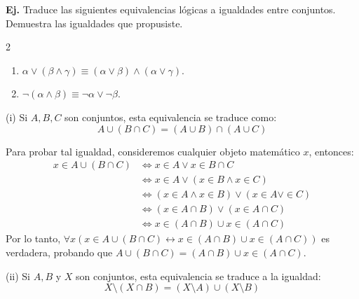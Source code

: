 \documentclass[letterpaper,DIV=14,headsepline,12pt]{scrartcl}
\makeatletter
\newcounter{Ejer}
\newcommand{\pts}{}
\newenvironment{ejercicio}[1]{\noindent
    \ifthenelse{\equal{#1}{1} \OR \equal{#1}{+1}}{\renewcommand{\pts}{\textbf{(#1 pt)}}}{\renewcommand{\pts}{\textbf{(#1 pts)}}}\textbf{Ej. \theEjer} \pts\stepcounter{Ejer}}{\vspace{.3cm}}
\newenvironment{solu}[1][]{%
        \par\pushQED{\hfill \lozenge}%
        \normalfont\topsep6pt \partopsep0pt %
        \trivlist
        \item[\hskip\labelsep
                \textbf{\textit{Solución.}}%
        ]#1
        }{%
        \popQED\endtrivlist\@endpefalse
    }
\makeatother
\begin{document}
    \begin{ejercicio}{1}
        Traduce las siguientes equivalencias lógicas a igualdades entre conjuntos. Demuestra las igualdades que propusiste.
        \begin{multicols}{2}
            \begin{enumerate}
                \item \(\alpha\lor(\beta\land\gamma)\equiv(\alpha\lor\beta)\land(\alpha\lor\gamma)\).
                \item \(\neg(\alpha\land\beta)\equiv\neg\alpha\lor\neg\beta\).
            \end{enumerate}
        \end{multicols}
    \end{ejercicio}
    \begin{solu}
        (i) Si $A,B,C$ son conjuntos, esta equivalencia se traduce como:
        \[ A \cup (B \cap C) = (A \cup B) \cap (A \cup C) \]
        
        Para probar tal igualdad, consideremos cualquier objeto matemático $x$, entonces:
        \begin{align*}
            x \in A \cup (B \cap C) & \Leftrightarrow x \in A \lor x \in B \cap C \tag*{Definición de $\cup$} \\
            & \Leftrightarrow x \in A \lor (x \in B \land x \in C) \tag*{Definición de $\cap$} \\
            & \Leftrightarrow (x \in A \land x \in B) \lor (x \in A \lor \in C) \tag*{$\alpha\lor(\beta\land\gamma)\equiv(\alpha\lor\beta)\land(\alpha\lor\gamma)$} \\
            & \Leftrightarrow (x \in A \cap B) \lor (x \in A \cap C) \tag*{Definición de $\cap$} \\
            & \Leftrightarrow x \in (A \cap B) \cup x \in (A \cap C) \tag*{Definición de $\cup$}
        \end{align*}
        Por lo tanto, $\forall x (x \in A \cup (B \cap C) \leftrightarrow x \in (A \cap B) \cup x \in (A \cap C))$ es verdadera, probando que $A \cup (B \cap C)=(A \cap B) \cup x \in (A \cap C)$.

        (ii) Si $A,B$ y $X$ son conjuntos, esta equivalencia se traduce a la igualdad:
        \[ X \setminus (X \cap B) = (X \setminus A) \cup (X \setminus B) \]


\end{solu}
\end{document}
